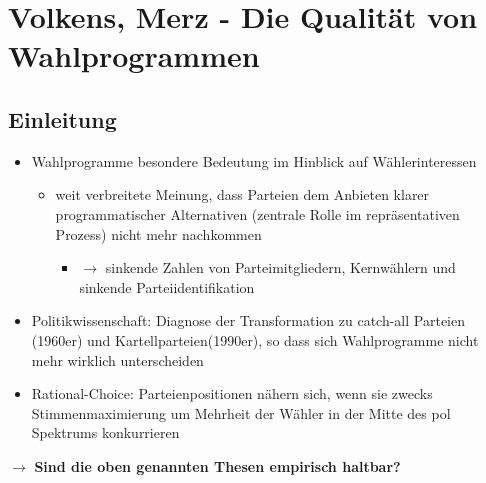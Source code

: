 \documentclass[11pt]{article}
\date{\today}
\title{}
\begin{document}
\tableofcontents

\section{Volkens, Merz - Die Qualität von Wahlprogrammen}
\label{sec:org7f8ca2b}
\subsection{Einleitung}
\label{sec:orgf652beb}
\begin{itemize}
\item Wahlprogramme besondere Bedeutung im Hinblick auf Wählerinteressen
\begin{itemize}
\item weit verbreitete Meinung, dass Parteien dem Anbieten klarer programmatischer Alternativen (zentrale Rolle im repräsentativen Prozess) nicht mehr nachkommen
\begin{itemize}
\item \(\rightarrow\) sinkende Zahlen von Parteimitgliedern, Kernwählern und sinkende Parteiidentifikation
\end{itemize}
\end{itemize}
\item Politikwissenschaft: Diagnose der Transformation zu catch-all Parteien (1960er) und Kartellparteien(1990er), so dass sich Wahlprogramme nicht mehr wirklich unterscheiden
\item Rational-Choice: Parteienpositionen nähern sich, wenn sie zwecks Stimmenmaximierung um Mehrheit der Wähler in der Mitte des pol Spektrums konkurrieren
\end{itemize}

\(\rightarrow\) \textbf{Sind die oben genannten Thesen empirisch haltbar?}
\end{document}

